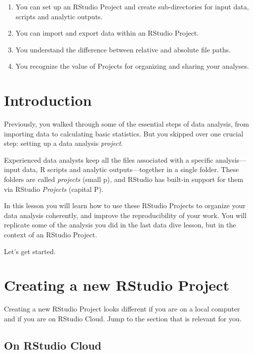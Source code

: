 \documentclass[
  letterpaper,
  DIV=11,
  numbers=noendperiod]{scrreprt}
\begin{document}
\begin{enumerate}
\def\labelenumi{\arabic{enumi}.}
\item
  You can set up an RStudio Project and create sub-directories for input
  data, scripts and analytic outputs.
\item
  You can import and export data within an RStudio Project.
\item
  You understand the difference between relative and absolute file
  paths.
\item
  You recognize the value of Projects for organizing and sharing your
  analyses.
\end{enumerate}

\hypertarget{introduction-6}{%
\section{Introduction}\label{introduction-6}}

Previously, you walked through some of the essential steps of data
analysis, from importing data to calculating basic statistics. But you
skipped over one crucial step: setting up a data analysis
\emph{project}.

Experienced data analysts keep all the files associated with a specific
analysis---input data, R scripts and analytic outputs---together in a
single folder. These folders are called \emph{projects} (small
p)\emph{,} and RStudio has built-in support for them via RStudio
\emph{Projects} (capital P).

In this lesson you will learn how to use these RStudio Projects to
organize your data analysis coherently, and improve the reproducibility
of your work. You will replicate some of the analysis you did in the
last data dive lesson, but in the context of an RStudio Project.

Let's get started.

\hypertarget{creating-a-new-rstudio-project}{%
\section{Creating a new RStudio
Project}\label{creating-a-new-rstudio-project}}

Creating a new RStudio Project looks different if you are on a local
computer and if you are on RStudio Cloud. Jump to the section that is
relevant for you.

\hypertarget{on-rstudio-cloud}{%
\subsection{On RStudio Cloud}\label{on-rstudio-cloud}}
\end{document}
